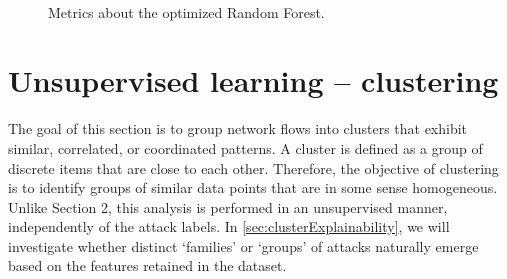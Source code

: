 \documentclass[acmlarge,nonacm]{acmart}
\begin{document}
\begin{figure}
	\centering
     \quad
	 \\
  	\caption{Metrics about the optimized Random Forest.} 
\end{figure}

\section{Unsupervised learning – clustering} \label{sec:unsupervisedLearning}
The goal of this section is to group network flows into clusters that exhibit similar, correlated, or coordinated patterns. A cluster is defined as a group of discrete items that are close to each other. Therefore, the objective of clustering is to identify groups of similar data points that are in some sense homogeneous.
Unlike Section 2, this analysis is performed in an unsupervised manner, independently of the attack labels. In \cref{sec:clusterExplainability}, we will investigate whether distinct `families' or `groups' of attacks naturally emerge based on the features retained in the dataset.
\end{document}
